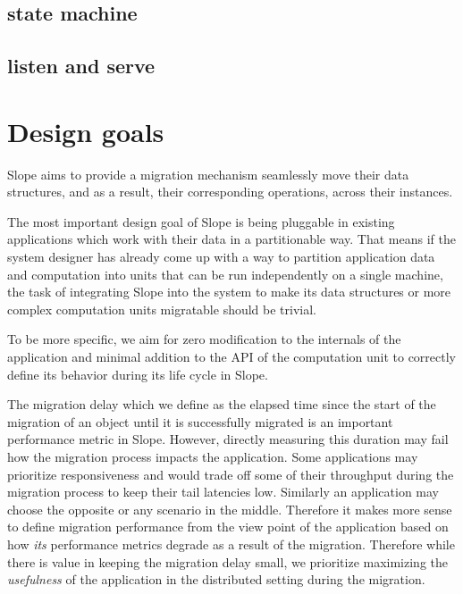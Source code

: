 \subsection{state machine}

\subsection{listen and serve}



\section{Design goals}

Slope aims to provide a migration mechanism 
seamlessly move their data structures, and as a result, their corresponding
operations, across their instances.

The most important design goal of Slope is being pluggable in existing
applications which work with their data in a partitionable way. That means if
the system designer has already come up with a way to partition
application data and computation into units that can be run independently on a
single machine, the task of integrating Slope into the system to make its data
structures or more complex computation units migratable should be trivial.

To be more specific, we aim for zero modification to the internals of the
application and minimal addition to the API of the computation unit to
correctly define its behavior during its life cycle in Slope.

The migration delay which we define as the elapsed time since the start of the
migration of an object until it is successfully migrated is an important
performance metric in Slope. However, directly measuring this duration may fail
 how the migration process impacts the application. Some
applications may prioritize responsiveness and would trade off some of their
throughput during the migration process to keep their tail latencies low.
Similarly an application may choose the opposite or any scenario in the middle.
Therefore it makes more sense to define migration performance from the view
point of the application based on how \emph{its} performance metrics degrade
as a result of the migration. Therefore while there is value in keeping the
migration delay small, we prioritize maximizing the \emph{usefulness} of the
application in the distributed setting during the migration.

